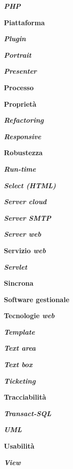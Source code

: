 \textbf{\textit{PHP}}

\textbf{Piattaforma}

\textbf{\textit{Plugin}}

\textbf{\textit{Portrait}}

\textbf{\textit{Presenter}}

\textbf{Processo}

\textbf{Proprietà}

\textbf{\textit{Refactoring}}

\textbf{\textit{Responsive}}

\textbf{Robustezza}

\textbf{\textit{Run-time}}

\textbf{\textit{Select (HTML)}}

\textbf{\textit{Server cloud}}

\textbf{\textit{Server SMTP}}

\textbf{\textit{Server web}}

\textbf{Servizio \textit{web}}

\textbf{\textit{Servlet}}

\textbf{Sincrona}

\textbf{Software gestionale}

\textbf{Tecnologie \textit{web}}

\textbf{\textit{Template}}

\textbf{\textit{Text area}}

\textbf{\textit{Text box}}

\textbf{\textit{Ticketing}}

\textbf{Tracciabilità}

\textbf{\textit{Transact-SQL}}

\textbf{\textit{UML}}

\textbf{Usabilità}

\textbf{\textit{View}}